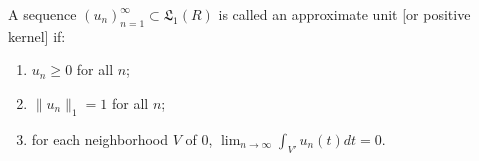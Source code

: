 A sequence $(u_n)_{n=1}^{\infty} \subset \mathfrak{L}_1(R)$ is called an approximate unit [or positive kernel] if:
\begin{enumerate}
\item[(i)] $u_n \geq 0$ for all $n$;
\item[(ii)] $\|u_n\|_1 = 1$ for all $n$;
\item[(iii)] for each neighborhood $V$ of $0$, $\lim_{n \to \infty} \int_{V'} u_n(t) dt = 0$.
\end{enumerate}
